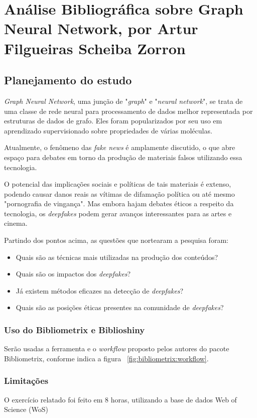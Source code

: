 \chapter{Análise Bibliográfica sobre Graph Neural Network, por Artur Filgueiras Scheiba Zorron\label{chap:bibliometria:titofrota}}

\section{Planejamento do estudo}

\textit{Graph Neural Network}, uma junção de "\textit{graph}" e "\textit{neural network}", se trata de uma classe de rede neural para processamento de dados melhor representada por estruturas de dados de grafo. Eles foram popularizados por seu uso em aprendizado supervisionado sobre propriedades de várias moléculas.

Atualmente, o fenômeno das \textit{fake news} é amplamente discutido, o que abre espaço para debates em torno da produção de materiais falsos utilizando essa tecnologia.

O potencial das implicações sociais e políticas de tais materiais é extenso, podendo causar danos reais as vítimas de difamação política ou até mesmo "pornografia de vingança". Mas embora hajam debates éticos a respeito da tecnologia, os \textit{deepfakes} podem gerar avanços interessantes para as artes e cinema. 

Partindo dos pontos acima, as questões que nortearam a pesquisa foram:
\begin{itemize}
    \item Quais são as técnicas mais utilizadas na produção dos conteúdos?
    \item Quais são os impactos dos \textit{deepfakes}?
    \item Já existem métodos eficazes na detecção de \textit{deepfakes}? 
    \item Quais são as posições éticas presentes na comunidade de \textit{deepfakes}?
\end{itemize}

\subsection{Uso do Bibliometrix e Biblioshiny}
Serão usadas a ferramenta e o \textit{workflow} proposto pelos autores do pacote Bibliometrix, conforme indica a figura ~\ref{fig:bibliometrix:workflow}.

\subsection{Limitações} O exercício relatado foi feito em 8 horas, utilizando a base de dados Web of Science (WoS)


